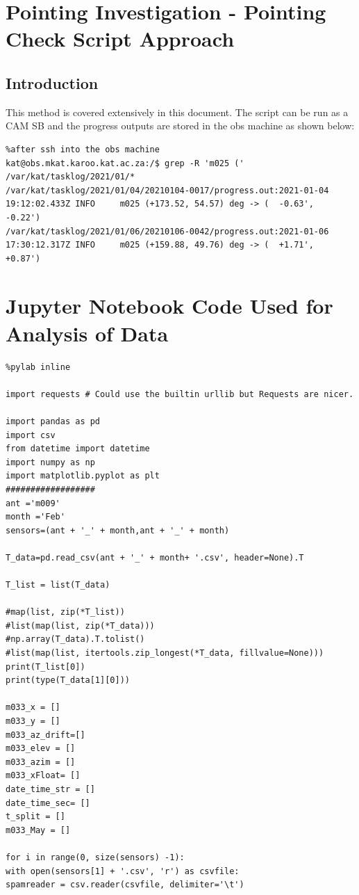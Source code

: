 \documentclass{article}
\begin{document}
{\begin{appendices}
\section{Pointing Investigation - Pointing Check Script Approach }\label{sec.py3}
\subsection{Introduction}
This method is covered extensively in this document. The script can be run as a CAM SB and the progress outputs are stored in the obs machine as shown below:
\begin{lstlisting}
%after ssh into the obs machine
kat@obs.mkat.karoo.kat.ac.za:/$ grep -R 'm025 (' /var/kat/tasklog/2021/01/*
/var/kat/tasklog/2021/01/04/20210104-0017/progress.out:2021-01-04 19:12:02.433Z INFO     m025 (+173.52, 54.57) deg -> (  -0.63',   -0.22')
/var/kat/tasklog/2021/01/06/20210106-0042/progress.out:2021-01-06 17:30:12.317Z INFO     m025 (+159.88, 49.76) deg -> (  +1.71',   +0.87')

\end{lstlisting}


\section{Jupyter Notebook Code Used for Analysis of Data  }\label{sec.py4}
\begin{lstlisting}
%pylab inline

import requests # Could use the builtin urllib but Requests are nicer.

import pandas as pd 
import csv
from datetime import datetime
import numpy as np
import matplotlib.pyplot as plt
##################	
ant ='m009' 
month ='Feb'
sensors=(ant + '_' + month,ant + '_' + month)

T_data=pd.read_csv(ant + '_' + month+ '.csv', header=None).T

T_list = list(T_data)

#map(list, zip(*T_list))
#list(map(list, zip(*T_data)))
#np.array(T_data).T.tolist()
#list(map(list, itertools.zip_longest(*T_data, fillvalue=None)))
print(T_list[0])
print(type(T_data[1][0])) 

m033_x = []
m033_y = []
m033_az_drift=[]
m033_elev = []
m033_azim = []
m033_xFloat= []
date_time_str = []
date_time_sec= []
t_split = []
m033_May = []

for i in range(0, size(sensors) -1):
with open(sensors[1] + '.csv', 'r') as csvfile:
spamreader = csv.reader(csvfile, delimiter='\t')


\end{lstlisting}
\end{appendices}}
\end{document}
